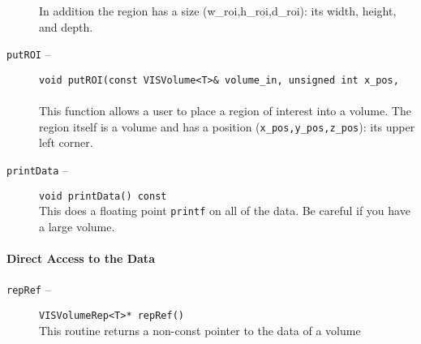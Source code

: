 \begin{description}
In addition the region has a size (w\_roi,h\_roi,d\_roi): its width, height, and depth.
\item[{\tt putROI} --]
{\tt void putROI(const VISVolume<T>\& volume\_in, unsigned int x\_pos,}\\
\hspace*{0.25in}{\tt unsigned int y\_pos, unsigned int z\_pos)}\\
This function allows a user to place a region of interest into a volume.
The region itself is a volume and has a position ({\tt x\_pos,y\_pos,z\_pos}): its
upper left corner.
\item[{\tt printData} --]
{\tt void printData() const}\\
This does a floating point {\tt printf} on all of the data.  Be careful if you have a large
volume.
\end{description}

\paragraph{Direct Access to the Data}
\begin{description}
\item[{\tt repRef} --]
{\tt VISVolumeRep<T>* repRef()}\\
This routine returns a non-const pointer to the data of a volume
\end{description}

